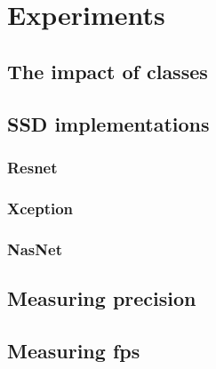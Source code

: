\chapter{Experiments}


\section{The impact of classes}

\section{SSD implementations}
\subsection{Resnet}
\subsection{Xception}
\subsection{NasNet}

\section{Measuring precision}

\section{Measuring fps}